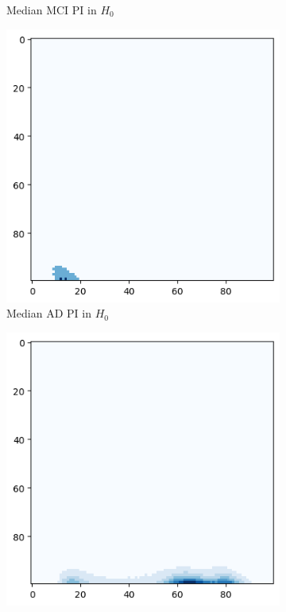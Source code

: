 \documentclass{article}
\begin{document}
\begin{figure}
\begin{subfigure}{0.32\textwidth}
    \caption{Median MCI PI in $H_0$}
  \end{subfigure}
  \begin{subfigure}{0.32\textwidth}
    \includegraphics[width=\textwidth]{figures/median_pls/median_pi_AD_h_0.png}
    \caption{Median AD PI in $H_0$}
  \end{subfigure}
  \begin{subfigure}{0.32\textwidth}
    \includegraphics[width=\textwidth]{figures/median_pls/median_pi_CN_h_1.png}

\end{subfigure}
\end{figure}
\end{document}

